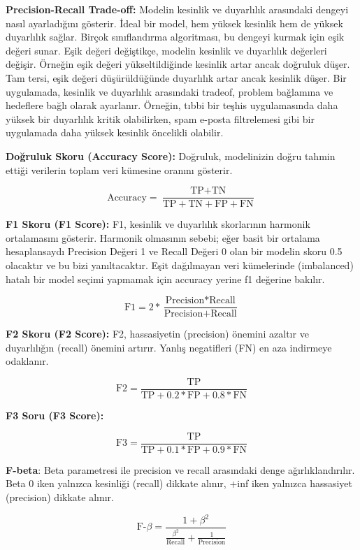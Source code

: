 \textbf{Precision-Recall Trade-off:} Modelin kesinlik ve duyarlılık arasındaki dengeyi nasıl ayarladığını gösterir. İdeal bir model, hem yüksek kesinlik hem de yüksek duyarlılık sağlar. Birçok sınıflandırma algoritması, bu dengeyi kurmak için eşik değeri sunar. Eşik değeri değiştikçe, modelin kesinlik ve duyarlılık değerleri değişir. Örneğin eşik değeri yükseltildiğinde kesinlik artar ancak doğruluk düşer. Tam tersi, eşik değeri düşürüldüğünde duyarlılık artar ancak kesinlik düşer. Bir uygulamada, kesinlik ve duyarlılık arasındaki tradeof, problem bağlamına ve hedeflere bağlı olarak ayarlanır. Örneğin, tıbbi bir teşhis uygulamasında daha yüksek bir duyarlılık kritik olabilirken, spam e-posta filtrelemesi gibi bir uygulamada daha yüksek kesinlik öncelikli olabilir.

\textbf{Doğruluk Skoru (Accuracy Score):} Doğruluk, modelinizin doğru tahmin ettiği verilerin toplam veri kümesine oranını gösterir.

\[\text{Accuracy} = \frac{\text{TP} + \text{TN}}{\text{TP} + \text{TN} + \text{FP} + \text{FN}}\]

\textbf{F1 Skoru (F1 Score):} F1, kesinlik ve duyarlılık skorlarının harmonik ortalamasını gösterir. Harmonik olmasının sebebi; eğer basit bir ortalama hesaplansaydı Precision Değeri 1 ve Recall Değeri 0 olan bir modelin skoru 0.5 olacaktır ve bu bizi yanıltacaktır. Eşit dağılmayan veri kümelerinde (imbalanced) hatalı bir model seçimi yapmamak için accuracy yerine f1 değerine bakılır.

\[\text{F1} = 2 * \frac{\text{Precision} * \text{Recall}}{\text{Precision} + \text{Recall}}\]

\textbf{F2 Skoru (F2 Score):} F2, hassasiyetin (precision) önemini azaltır ve duyarlılığın (recall) önemini artırır. Yanlış negatifleri (FN) en aza indirmeye odaklanır.

\[\text{F2} = \frac{\text{TP}}{\text{TP} + 0.2 * \text{FP} + 0.8 * \text{FN}}\]

\textbf{F3 Soru (F3 Score):}

\[\text{F3} = \frac{\text{TP}}{\text{TP} + 0.1 * \text{FP} + 0.9 * \text{FN}}\]

\textbf{F-beta}: Beta parametresi ile precision ve recall arasındaki denge ağırlıklandırılır. Beta 0 iken yalnızca kesinliği (recall) dikkate alınır, +inf iken yalnızca hassasiyet (precision) dikkate alınır.

\[\text{F-}\beta = \frac{1 + \beta^2}{\frac{\beta^2}{\text{Recall}} + \frac{1}{\text{Precision}}}\]

